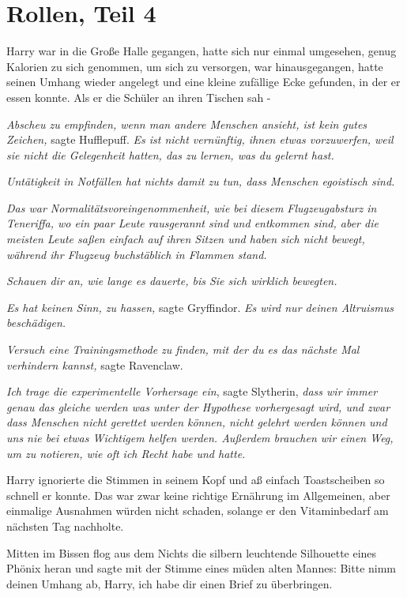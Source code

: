 \chapter{Rollen, Teil 4}

Harry war in die Große Halle gegangen, hatte sich nur einmal umgesehen, genug
Kalorien zu sich genommen, um sich zu versorgen, war hinausgegangen, hatte
seinen Umhang wieder angelegt und eine kleine zufällige Ecke gefunden, in der er
essen konnte. Als er die Schüler an ihren Tischen sah -

\emph{Abscheu zu empfinden, wenn man andere Menschen ansieht, ist kein gutes
Zeichen,} sagte Hufflepuff.\emph{ Es ist nicht vernünftig, ihnen etwas
vorzuwerfen, weil sie nicht die Gelegenheit hatten, das zu lernen, was du
gelernt hast.}

\emph{Untätigkeit in Notfällen hat nichts damit zu tun, dass Menschen egoistisch
sind.}

\emph{Das war Normalitätsvoreingenommenheit, wie bei diesem Flugzeugabsturz in
Teneriffa, wo ein paar Leute rausgerannt sind und entkommen sind, aber die
meisten Leute saßen einfach auf ihren Sitzen und haben sich nicht bewegt,
während ihr Flugzeug buchstäblich in Flammen stand.}

\emph{Schauen dir an, wie lange es dauerte, bis Sie sich wirklich bewegten.}

\emph{Es hat keinen Sinn, zu hassen,} sagte Gryffindor. \emph{Es wird nur deinen
Altruismus beschädigen.}

\emph{Versuch eine Trainingsmethode zu finden, mit der du es das nächste Mal
verhindern kannst,} sagte Ravenclaw.

\emph{Ich trage die experimentelle Vorhersage ein}, sagte Slytherin, \emph{dass
wir immer genau das gleiche werden was unter der Hypothese vorhergesagt wird,
und zwar dass Menschen nicht gerettet werden können, nicht gelehrt werden können
und uns nie bei etwas Wichtigem helfen werden. Außerdem brauchen wir einen Weg,
um zu notieren, wie oft ich Recht habe und hatte.}

Harry ignorierte die Stimmen in seinem Kopf und aß einfach Toastscheiben so
schnell er konnte. Das war zwar keine richtige Ernährung im Allgemeinen, aber
einmalige Ausnahmen würden nicht schaden, solange er den Vitaminbedarf am
nächsten Tag nachholte.

Mitten im Bissen flog aus dem Nichts die silbern leuchtende Silhouette eines
Phönix heran und sagte mit der Stimme eines müden alten Mannes: \glqq{}Bitte nimm
deinen Umhang ab, Harry, ich habe dir einen Brief zu überbringen.\grqq{}

